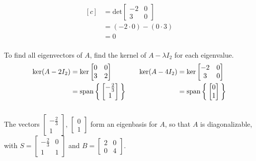 \documentclass[letterpaper,12pt]{article}
\begin{document}
\begin{enumerate}
\begin{equation*}
\begin{aligned}[c]
        &= \text{det}\begin{bmatrix}
          -2 & 0 \\
          3 & 0
        \end{bmatrix} \\
        &= (-2 \cdot 0) - (0 \cdot 3) \\
        &= 0
      \end{aligned}
    \end{equation*} \\
    To find all eigenvectors of $A$, find the kernel of $A - \lambda I_2$ for each eigenvalue.
    \begin{equation*}
      \begin{aligned}[c]
        \text{ker}(A - 2I_2) &= \text{ker}\begin{bmatrix}
          0 & 0 \\
          3 & 2
        \end{bmatrix} \\
        &= \text{span}\Set{
          \begin{bmatrix}
            -\frac{2}{3} \\ 1
          \end{bmatrix}
        }
      \end{aligned}
      \qquad
      \begin{aligned}[c]
        \text{ker}(A - 4I_2) &= \text{ker}\begin{bmatrix}
          -2 & 0 \\
          3 & 0
        \end{bmatrix} \\
        &= \text{span}\Set{
          \begin{bmatrix}
            0 \\ 1
          \end{bmatrix}
        }
      \end{aligned}
    \end{equation*} \\
    The vectors $\begin{bmatrix}-\frac{2}{3} \\ 1\end{bmatrix}$, $\begin{bmatrix}0 \\ 1\end{bmatrix}$ form an eigenbasis for $A$, so that $A$ is diagonalizable, with $S = \begin{bmatrix}-\frac{2}{3} & 0 \\ 1 & 1\end{bmatrix}$ and $B = \begin{bmatrix}2 & 0 \\ 0 & 4\end{bmatrix}$.
\end{enumerate}
\end{document}
